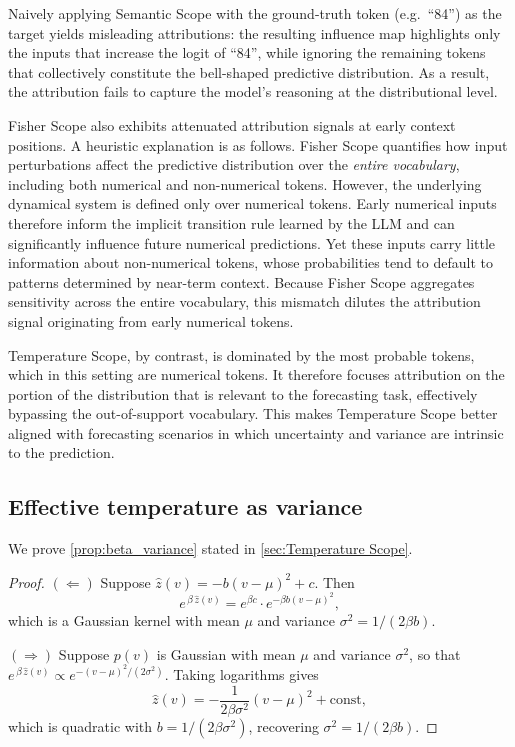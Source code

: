 \documentclass{article}
\begin{document}
Naively applying Semantic Scope with the ground-truth token (e.g.\ ``84'') as the target yields misleading attributions: the resulting influence map highlights only the inputs that increase the logit of ``84'', while ignoring the remaining tokens that collectively constitute the bell-shaped predictive distribution.
As a result, the attribution fails to capture the model’s reasoning at the distributional level. 

Fisher Scope also exhibits attenuated attribution signals at early context positions.
A heuristic explanation is as follows.
Fisher Scope quantifies how input perturbations affect the predictive distribution over the \emph{entire vocabulary}, including both numerical and non-numerical tokens.
However, the underlying dynamical system is defined only over numerical tokens.
Early numerical inputs therefore inform the implicit transition rule learned by the LLM \citep{liu-etal-2024-llms-learn} and can significantly influence future numerical predictions.
Yet these inputs carry little information about non-numerical tokens, whose probabilities tend to default to patterns determined by near-term context.
Because Fisher Scope aggregates sensitivity across the entire vocabulary, this mismatch dilutes the attribution signal originating from early numerical tokens.

Temperature Scope, by contrast, is dominated by the most probable tokens, which in this setting are numerical tokens.
It therefore focuses attribution on the portion of the distribution that is relevant to the forecasting task, effectively bypassing the out-of-support vocabulary.
This makes Temperature Scope better aligned with forecasting scenarios in which uncertainty and variance are intrinsic to the prediction.

\subsection{Effective temperature as variance}
\label{app:beta_variance}

We prove \cref{prop:beta_variance} stated in \cref{sec:Temperature Scope}.

\begin{proof}
$(\Leftarrow)$
Suppose $\hat{z}(v) = -b(v-\mu)^2 + c$.
Then
\[
    e^{\,\beta\,\hat{z}(v)} = e^{\beta c}\cdot e^{-\beta b(v-\mu)^2},
\]
which is a Gaussian kernel with mean $\mu$ and variance $\sigma^2 = 1/(2\beta b)$.

$(\Rightarrow)$
Suppose $p(v)$ is Gaussian with mean $\mu$ and variance $\sigma^2$, so that $e^{\,\beta\,\hat{z}(v)} \propto e^{-(v-\mu)^2/(2\sigma^2)}$.
Taking logarithms gives
\[
    \hat{z}(v) = -\frac{1}{2\beta\sigma^2}(v-\mu)^2 + \mathrm{const},
\]
which is quadratic with $b = 1/(2\beta\sigma^2)$, recovering $\sigma^2 = 1/(2\beta b)$.
\end{proof}
\end{document}
